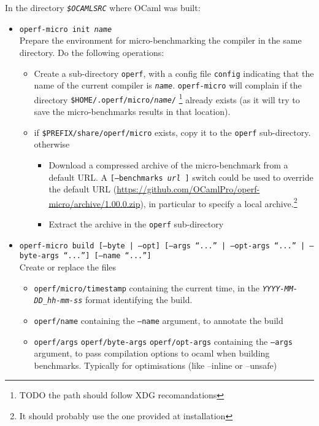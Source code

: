 \documentclass[11pt,a4paper]{article}
\begin{document}
In the directory {\tt\em \$OCAMLSRC} where OCaml was built:
\begin{itemize}
\item {\tt operf-micro init {\em name}}\\ Prepare the environment
  for micro-benchmarking the compiler in the same directory.
  Do the following operations:
  \begin{itemize}
  \item Create a sub-directory {\tt operf}, with a config file {\tt config}
  indicating that the name of the current compiler is {\tt\em name}.
  {\tt operf-micro} will complain if the directory
  {\tt \$HOME/.operf/micro/{\em name}/} \footnote{TODO the path should
    follow XDG recomandations} already exists (as it will try to
  save the micro-benchmarks results in that location).
  \item
    if {\tt \$PREFIX/share/operf/micro} exists, copy it to the
    {\tt operf} sub-directory.\\
    otherwise
    \begin{itemize}
    \item Download a compressed archive of the micro-benchmark from a
      default URL. A {\tt [--benchmarks {\em url} ]} switch could be
      used to override the default URL
      (\url{https://github.com/OCamlPro/operf-micro/archive/1.00.0.zip}),
      in particular to specify a local archive.\footnote{It should
        probably use the one provided at installation}
    \item Extract the archive in the {\tt operf} sub-directory
    \end{itemize}
  \end{itemize}
\item {\tt operf-micro build [--byte | --opt] [--args ``...'' | --opt-args ``...'' | --byte-args ``...''] [--name ``...'']}\\
  Create or replace the files
  \begin{itemize}
  \item {\tt operf/micro/timestamp} containing the current time, in the
    {\tt\em YYYY-MM-DD\_hh-mm-ss} format identifying the build.
  \item {\tt operf/name} containing the {\tt --name} argument, to
    annotate the build
  \item {\tt operf/args} {\tt operf/byte-args} {\tt operf/opt-args}
    containing the {\tt --args} argument, to pass compilation options
    to ocaml when building benchmarks. Typically for optimisations
    (like --inline or --unsafe)

\end{itemize}
\end{itemize}
\end{document}

